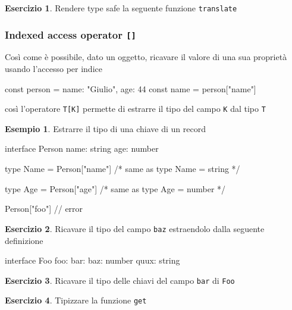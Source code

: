 \documentclass[12pt]{article}
\theoremstyle{definition}
\newtheorem{example}{Esempio}[subsection]
\newtheorem{exercise}{Esercizio}[subsection]
\newenvironment{code}
  {\vspace{0.5cm} \VerbatimEnvironment\begin{typescriptcode}}
  {\end{typescriptcode} \vspace{0.2cm}}
\begin{document}
\begin{exercise}
Rendere type safe la seguente funzione \texttt{translate}
\end{exercise}

\subsubsection{Indexed access operator \texttt{[]}}

Così come è possibile, dato un oggetto, ricavare il valore di una sua proprietà usando l'accesso per indice

\begin{code}
const person = { name: "Giulio", age: 44 }
const name = person["name"]
\end{code}

così l'operatore \texttt{T[K]} permette di estrarre il tipo del campo \texttt{K} dal tipo \texttt{T}

\begin{example}
Estrarre il tipo di una chiave di un record

\begin{code}
interface Person {
  name: string
  age: number
}

type Name = Person["name"]
/* same as
type Name = string
*/

type Age = Person["age"]
/* same as
type Age = number
*/

Person["foo"] // error
\end{code}
\end{example}

\begin{exercise}
Ricavare il tipo del campo \texttt{baz} estraendolo dalla seguente definizione

\begin{code}
interface Foo {
  foo: {
    bar: {
      baz: number
      quux: string
    }
  }
}
\end{code}
\end{exercise}

\begin{exercise}
Ricavare il tipo delle chiavi del campo \texttt{bar} di \texttt{Foo}
\end{exercise}

\begin{exercise}
Tipizzare la funzione \texttt{get}
\end{exercise}
\end{document}
